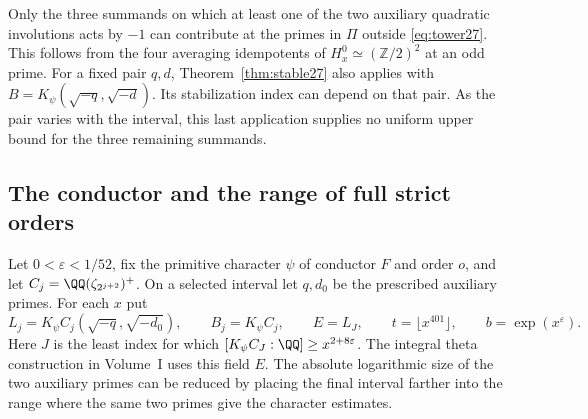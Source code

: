 \documentclass[a4paper,11pt]{article}
\theoremstyle{definition}
\theoremstyle{remark}
\newcommand{\ZZ}{\mathbb Z}\newcommand{\ord}{\operatorname{ord}}
\numberwithin{equation}{section}
\begin{document}
Only the three summands on which at least one of the two auxiliary quadratic involutions acts by \(-1\) can contribute at the primes in \(\Pi\) outside \eqref{eq:tower27}. This follows from the four averaging idempotents of \(H_x^0\simeq(\ZZ/2)^2\) at an odd prime. For a fixed pair \(q,d\), Theorem~\ref{thm:stable27} also applies with \(B=K_\psi(\sqrt{-q},\sqrt{-d})\). Its stabilization index can depend on that pair. As the pair varies with the interval, this last application supplies no uniform upper bound for the three remaining summands.

\subsection{The conductor and the range of full strict orders}\label{nav:II-19}
\label{sec:smaller197}

Let \(0<\varepsilon<1/52\), fix the primitive character \(\psi\)
of conductor \(F\) and order \(o\), and let
\(C_j=\QQ(\zeta_{2^{j+2}})^+\). On a selected interval let
\(q,d_0\) be the prescribed auxiliary primes. For each \(x\) put
\[
 L_j=K_\psi C_j(\sqrt{-q},\sqrt{-d_0}),\qquad
 B_j=K_\psi C_j,\qquad
 E=L_J,\qquad t=\lfloor x^{401}\rfloor,\qquad b=\exp(x^\varepsilon).
\]
Here \(J\) is the least index for which
\([K_\psi C_J:\QQ]\ge x^{2+8\varepsilon}\).
The integral theta construction in Volume~I uses this field \(E\).
The absolute logarithmic size of the two auxiliary primes can be
reduced by placing the final interval farther into the range
where the same two primes give the character estimates.
\end{document}
